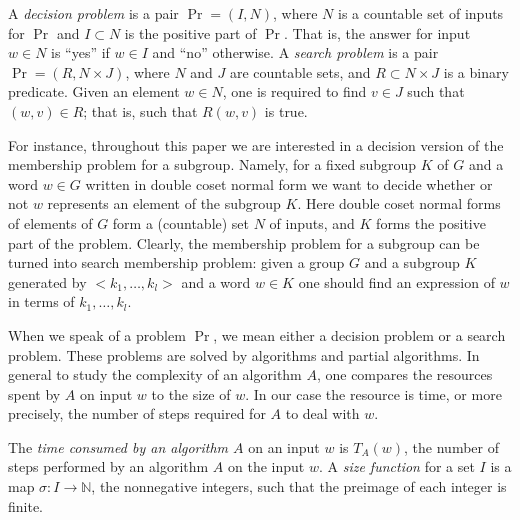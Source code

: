 \documentclass[a4paper,12pt]{article}
\newtheorem{definition}[theorem]{Definition}
\numberwithin{equation}{section}
\numberwithin{figure}{section}
\begin{document}
A \emph{decision problem} is a pair $\Pr = (I,N)$, where $N$ is a countable
set of inputs for $\Pr$ and $I\subset N$ is the positive part of
$\Pr$. That is, the answer for input $w\in N$ is ``yes'' if $w\in I$
and ``no'' otherwise. A \emph{search problem} is a pair $\Pr = (R,N\times J)$, where $N$ and $J$
are countable sets, and $R\subset N\times J$ is a binary predicate.
Given an element $w\in N$, one is required to find $v\in J$ such
that $(w,v)\in R$; that is, such that $R(w,v)$ is true.


For instance, throughout this paper we are interested in a decision version of the membership problem for a subgroup. Namely,
for a fixed subgroup $K$ of $G$ and a word $w \in G$ written in double coset normal form we want to decide 
whether or not $w$ represents an element of  the subgroup $K$. Here double coset normal forms of elements of $G$ form a (countable) set $N$ of inputs, and $K$ forms the positive part of the problem. Clearly, the membership problem for a subgroup can be turned into search membership problem: given a group $G$ and a subgroup $K$  generated by $<k_1, \ldots, k_l>$ and a word $w \in K$ one should find an expression of $w$ in terms of $k_1, \ldots, k_l$.

When we speak of a problem $\Pr$, we mean either a decision problem
or a search problem. These problems are solved by algorithms and partial
algorithms. In general to study the complexity of an algorithm $A$,
one compares the resources spent by $A$ on input $w$ to the size of
$w$. In our case the resource is time, or more precisely, the number
of steps required for $A$ to deal with $w$.

The \emph{time consumed by an algorithm $A$} on an input $w$ is
$T_{A}(w)$, the number of steps performed by an algorithm $A$ on
the input $w$. 
A \emph{size function} for a set $I$ is a map $\sigma:I\to \mathbb N$, the
nonnegative integers, such that the preimage of each integer is
finite.

%

\end{document}
